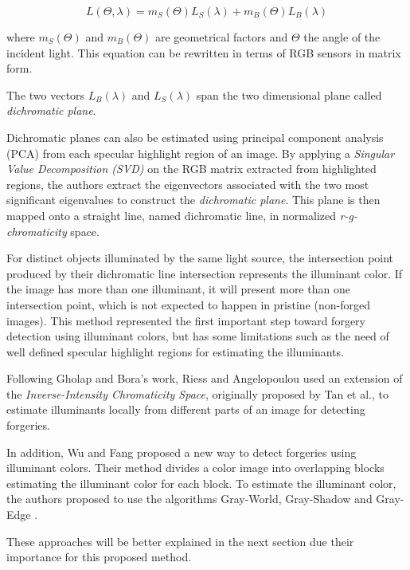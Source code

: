 \begin{equation} \label{eq:dichromaticmodel}
L(\Theta, \lambda) = m_S(\Theta) L_S(\lambda) + m_B(\Theta) L_B(\lambda)
\end{equation}

where $m_S(\Theta)$ and $m_B(\Theta)$ are geometrical factors and $\Theta$ the angle of the incident light. This equation can be rewritten in terms of RGB sensors in matrix form.

The two vectors $L_B(\lambda)$ and $L_S(\lambda)$ span the two dimensional plane called \emph{dichromatic plane}.

Dichromatic planes can also be estimated using principal component analysis (PCA) from each specular highlight region of an image. By applying a \emph{Singular Value Decomposition (SVD)} on the RGB matrix extracted from highlighted regions, the authors extract the eigenvectors associated with the two most significant eigenvalues to construct the \emph{dichromatic plane}. This plane is then mapped onto a straight line, named dichromatic line, in normalized \emph{r-g-chromaticity} space. 

For distinct objects illuminated by the same light source, the intersection point produced by their dichromatic line intersection represents the illuminant color. If the image has more than one illuminant, it will present more than one intersection point, which is not expected to happen in pristine (non-forged images). This method represented the first important step toward forgery detection using illuminant colors, but has some limitations such as the need of well defined specular highlight regions for estimating the illuminants.

Following Gholap and Bora’s work, Riess and Angelopoulou\cite{riess2010scene} used an extension of the \emph{Inverse-Intensity Chromaticity Space}, originally proposed by Tan et al.\cite{tan2004color}, to estimate illuminants locally from different parts of an image for detecting forgeries.

In addition, Wu and Fang\cite{wu2011image} proposed a new way to detect forgeries using illuminant colors. Their method divides a color image into overlapping blocks estimating the illuminant color for each block. To estimate the illuminant color, the authors proposed to use the algorithms Gray-World, Gray-Shadow and Gray-Edge \cite{van2007edge}.

These approaches will be better explained in the next section due their importance for this proposed method.

